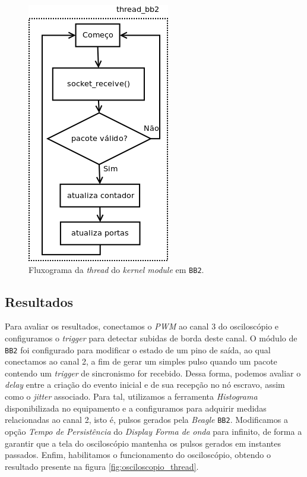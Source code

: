 \begin{figure}[h]

\centering
\includegraphics[scale=0.55]{image/thread_bb2}
\caption {Fluxograma da \textit{thread} do \textit{kernel module} em
\texttt{BB2}.}
\label{fig:thread_bb2}
\end{figure}

\FloatBarrier

\subsection {Resultados}

Para avaliar os resultados, conectamos o \textit{PWM} ao canal 3 do osciloscópio
e configuramos o \textit{trigger} para detectar subidas de borda deste canal. O
módulo de \texttt{BB2} foi configurado para modificar o estado de um pino de
saída, ao qual conectamos ao canal 2, a fim de gerar um simples pulso quando um
pacote contendo um \textit{trigger} de sincronismo for recebido. Dessa forma,
podemos avaliar o \textit{delay} entre a criação do evento inicial e de sua
recepção no nó escravo, assim como o \textit{jitter} associado. Para tal,
utilizamos a ferramenta \textit{Histograma} disponibilizada no equipamento e a
configuramos para adquirir medidas relacionadas ao canal 2, isto é, pulsos
gerados pela \textit{Beagle} \texttt{BB2}. Modificamos a opção \textit{Tempo de
Persistência} do \textit{Display Forma de onda} para infinito, de forma a
garantir que a tela do osciloscópio mantenha os pulsos gerados em instantes
passados. Enfim, habilitamos o funcionamento do osciloscópio, obtendo o
resultado presente na figura \ref{fig:osciloscopio_thread}.

